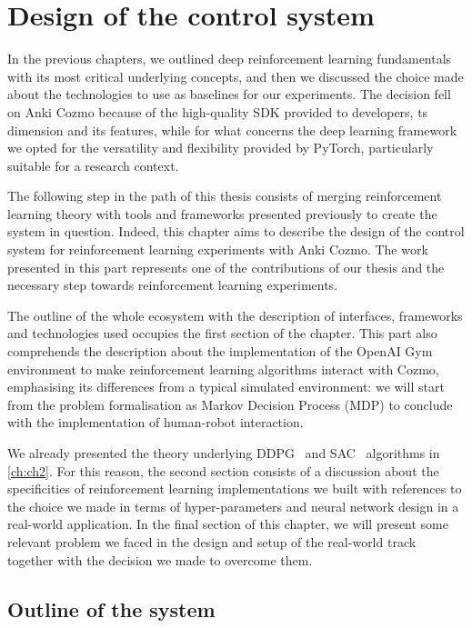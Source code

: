\chapter{Design of the control system}\label{ch:ch4}

In the previous chapters, we outlined deep reinforcement learning fundamentals with its most critical underlying concepts, and then we discussed the choice made about the technologies to use as baselines for our experiments.
The decision fell on Anki Cozmo because of the high-quality SDK provided to developers, ts dimension and its features, while for what concerns the deep learning framework we opted for the versatility and flexibility provided by PyTorch, particularly suitable for a research context.

The following step in the path of this thesis consists of merging reinforcement learning theory with tools and frameworks presented previously to create the system in question.
Indeed, this chapter aims to describe the design of the control system for reinforcement learning experiments with Anki Cozmo.
The work presented in this part represents one of the contributions of our thesis and the necessary step towards reinforcement learning experiments.

The outline of the whole ecosystem with the description of interfaces, frameworks and technologies used occupies the first section of the chapter.
This part also comprehends the description about the implementation of the OpenAI Gym environment to make reinforcement learning algorithms interact with Cozmo, emphasising its differences from a typical simulated environment: we will start from the problem formalisation as Markov Decision Process (MDP) to conclude with the implementation of human-robot interaction.

We already presented the theory underlying DDPG~\cite{lillicrap2015continuous} and SAC~\cite{haarnoja2018soft, haarnoja2018alg} algorithms in \vref{ch:ch2}.
For this reason, the second section consists of a discussion about the specificities of reinforcement learning implementations we built with references to the choice we made in terms of hyper-parameters and neural network design in a real-world application.
In the final section of this chapter, we will present some relevant problem we faced in the design and setup of the real-world track together with the decision we made to overcome them.

\section{Outline of the system}\label{sec:outline-of-the-system}

